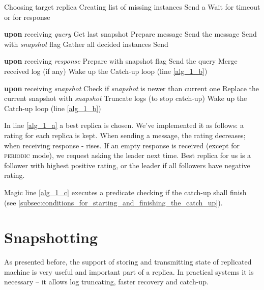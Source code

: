 \begin{algorithmic}[1]
  \REPEAT
    \STATE \label{alg_1_a} Choosing target replica
    \STATE Creating list of missing instances
    \STATE Send a \catchUpQuery
    \STATE \label{alg_1_b} Wait for timeout or for response
  
  \vspace{1em}
  
  \STATE \textbf{upon} receiving \catchUpQuery \textit{query}
      \STATE Get last snapshot
      \STATE Prepare \catchUpSnapshot message
      \STATE Send the message
      \STATE Send \catchUpResponse with \textit{snapshot} flag
    \ELSE
      \STATE Gather all decided instances
      \STATE Send \catchUpResponse
    \ENDIF

  \vspace{1em}
  \STATE \textbf{upon} receiving \catchUpResponse \textit{response}
      \STATE Prepare \catchUpQuery with snapshot flag
      \STATE Send the query
    \ELSE
      \STATE Merge received log (if any)
      \STATE Wake up the Catch-up loop (line \ref{alg_1_b})
    \ENDIF
  
  \vspace{1em}
  \STATE \textbf{upon} receiving \catchUpSnapshot \textit{snapshot}
  \STATE Check if \textit{snapshot} is newer than current one
  \STATE Replace the current snapshot with \textit{snapshot}
  \STATE Truncate logs (to stop catch-up)
  \STATE Wake up the Catch-up loop (line \ref{alg_1_b})

\end{algorithmic}

\vspace{1em}

In line \ref{alg_1_a} a best replica is chosen. We've implemented it as follows: a rating for each replica is kept. When sending a message, the rating decreases; when receiving response - rises. If an empty response is received (except for \textsc{periodic} mode), we request asking the leader next time. Best replica for us is a follower with highest positive rating, or the leader if all followers have negative rating.

Magic line \ref{alg_1_c} executes a predicate checking if the catch-up shall finish (see \ref{subsec:conditions_for_starting_and_finishing_the_catch_up}).

\section{Snapshotting}
\label{sec:snapshotting}
As presented before, the support of storing and transmitting state of replicated machine is very useful and important part of a replica. In practical systems it is necessary -- it allows log truncating, faster recovery and catch-up.

